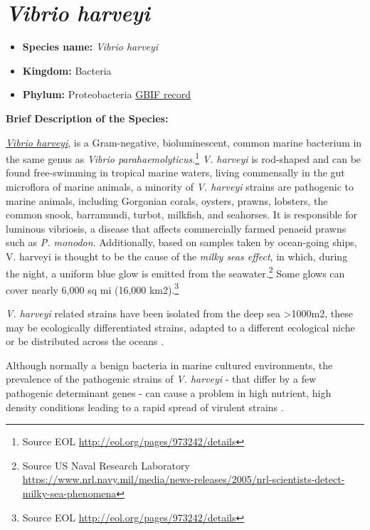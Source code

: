 \documentclass[]{book}
\providecommand{\tightlist}{%
  \setlength{\itemsep}{0pt}\setlength{\parskip}{0pt}}
\let\rmarkdownfootnote\footnote%
\def\footnote{\protect\rmarkdownfootnote}
\theoremstyle{definition}
\theoremstyle{definition}
\theoremstyle{definition}
\theoremstyle{remark}
\begin{document}
\hypertarget{vibrio-harveyi}{%
\section{\texorpdfstring{\emph{Vibrio
harveyi}}{Vibrio harveyi}}\label{vibrio-harveyi}}

\begin{itemize}
\tightlist
\item
  \textbf{Species name:} \emph{Vibrio harveyi}
\item
  \textbf{Kingdom:} Bacteria\\
\item
  \textbf{Phylum:} Proteobacteria
  \href{https://www.gbif.org/species/5427692}{GBIF record}
\end{itemize}

\textbf{Brief Description of the Species:}

\href{http://eol.org/pages/973242/details}{\emph{Vibrio harveyi}}, is a
Gram-negative, bioluminescent, common marine bacterium in the same genus
as \emph{Vibrio parahaemolyticus}.\footnote{Source EOL
  \url{http://eol.org/pages/973242/details}} \emph{V. harveyi} is
rod-shaped and can be found free-swimming in tropical marine waters,
living commensally in the gut microflora of marine animals, a minority
of \emph{V. harveyi} strains are pathogenic to marine animals, including
Gorgonian corals, oysters, prawns, lobsters, the common snook,
barramundi, turbot, milkfish, and seahorses. It is responsible for
luminous vibriosis, a disease that affects commercially farmed penaeid
prawns such as \emph{P. monodon}. Additionally, based on samples taken
by ocean-going ships, V. harveyi is thought to be the cause of the
\emph{milky seas effect}, in which, during the night, a uniform blue
glow is emitted from the seawater.\footnote{Source US Naval Research
  Laboratory
  \url{https://www.nrl.navy.mil/media/news-releases/2005/nrl-scientists-detect-milky-sea-phenomena}}
Some glows can cover nearly 6,000 sq mi (16,000 km2).\footnote{Source
  EOL \url{http://eol.org/pages/973242/details}}

\emph{V. harveyi} related strains have been isolated from the deep sea
\textgreater{}1000m2, these may be ecologically differentiated strains,
adapted to a different ecological niche or be distributed across the
oceans \citep{Hasan_2015}.

Although normally a benign bacteria in marine cultured environments, the
prevalence of the pathogenic strains of \emph{V. harveyi} - that differ
by a few pathogenic determinant genes - can cause a problem in high
nutrient, high density conditions leading to a rapid spread of virulent
strains \citep{Ben_Haim_2003}.
\end{document}
